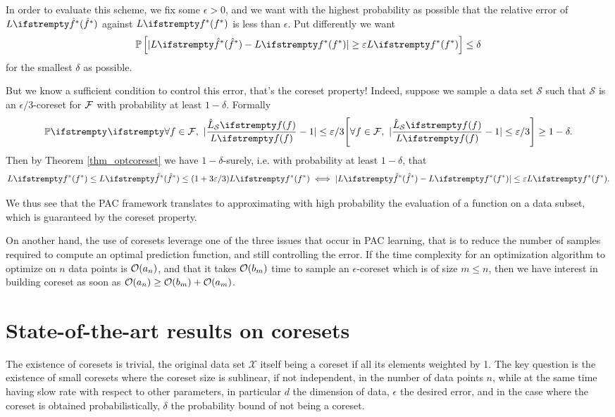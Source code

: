 In order to evaluate this scheme, we fix some $\epsilon>0$, and we want with the highest probability as possible that the relative error of $\loss{\hat\query^*}$ against $\loss{\query^*}$ is less than $\epsilon$. Put differently we want
\begin{equation*}
	\mathbb{P}\left[|\loss{\hat\query^*} - \loss{\query^*}| \ge \epsilon \loss{\query^*}\right] \leq \delta
\end{equation*}
for the smallest $\delta$ as possible.

But we know a sufficient condition to control this error, that's the coreset property! Indeed, suppose we sample a data set $\mathcal{S}$ such that $\mathcal{S}$ is an $\epsilon/3$-coreset for $\mathcal{F}$ with probability at least $1-\delta$. Formally
\begin{equation*}
    \PP{}{\forall f \in \qset,\ |\frac{\estloss{\mathcal{S}}{\query}}{\loss{\query}} - 1| \leq \epsilon/3} \geq 1- \delta.
\end{equation*}
Then by Theorem \ref{thm_optcoreset} we have $1-\delta$-surely, i.e. with probability at least $1-\delta$, that
\begin{equation*}
    \loss{\query^*} \leq \loss{\hat\query^*} \leq (1+ 3 \epsilon/3) \loss{\query^*} \iff
    |\loss{\hat\query^*} - \loss{\query^*}| \leq \epsilon \loss{\query^*}.
\end{equation*}

We thus see that the PAC framework translates to approximating with high probability the evaluation of a function on a data subset, which is guaranteed by the coreset property. 

On another hand, the use of coresets leverage one of the three issues that occur in PAC learning, that is to reduce the number of samples required to compute an optimal prediction function, and still controlling the error. If the time complexity for an optimization algorithm to optimize on $n$ data points is $\mathcal{O}(a_n)$, and that it takes $\mathcal{O}(b_m)$ time to sample an $\epsilon$-coreset which is of size $m \le n$, then we have interest in building coreset as soon as $\mathcal{O}(a_n) \geq \mathcal{O}(b_m) + \mathcal{O}(a_m)$.





    

\section{State-of-the-art results on coresets}
The existence of coresets is trivial, the original data set $\mathcal{X}$ itself  being a coreset if all its elements weighted by 1. The key question is the existence of small coresets where the coreset size is sublinear, if not independent, in the number of data points $n$, while at the same time having slow rate with respect to other parameters, in particular $d$ the dimension of data, $\epsilon$ the desired error, and in the case where the coreset is obtained probabilistically, $\delta$ the probability bound of not being a coreset.

